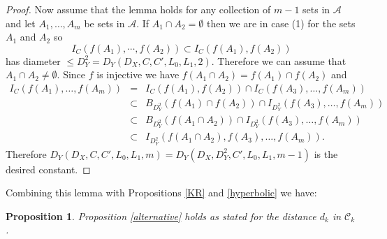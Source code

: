 \documentclass[11pt]{article}
\newtheorem{prop}[thm]{Proposition}
\theoremstyle{remark}
\def\A{{\mathcal A}}
\def\C{{\mathcal C}}
\begin{document}
\begin{proof}
Now assume that the lemma holds for any collection of $m-1$ sets in $\A$ and let $A_1, \dots, A_m$ be sets in $\A$.  If $A_1 \cap A_2 = \emptyset$ then we are in case (1) for the sets $A_1$ and $A_2$ so
$$I_C(f(A_1), \cdots, f(A_2)) \subset I_C(f(A_1), f(A_2))$$
has diameter $\le D^2_Y= D_Y(D_X, C, C', L_0, L_1, 2)$. Therefore we can assume that $A_1 \cap A_2 \neq \emptyset$. Since $f$ is injective we have $f(A_1 \cap A_2) = f(A_1) \cap f(A_2)$ and
\begin{eqnarray*}
I_C(f(A_1), \dots, f(A_m)) &=& I_C(f(A_1), f(A_2)) \cap I_C(f(A_3), \dots, f(A_m)) \\
& \subset & B_{D^2_Y}(f(A_1) \cap f(A_2)) \cap I_{D^2_Y}(f(A_3), \dots, f(A_m)) \\
& \subset & B_{D^2_Y}(f(A_1 \cap A_2)) \cap I_{D^2_Y}(f(A_3), \dots, f(A_m)) \\
& \subset & I_{D^2_Y}(f(A_1 \cap A_2),f(A_3), \dots, f(A_m)).
\end{eqnarray*}
Therefore $D_Y(D_X, C,C', L_0, L_1, m) = D_Y(D_X, D^2_Y,C', L_0, L_1, m-1)$ is the desired constant.
\end{proof}

Combining this lemma with Propositions \ref{KR} and \ref{hyperbolic} we have:

\begin{prop}\label{k alternative}
  Proposition \ref{alternative} holds as stated for the distance $d_k$
  in $\C_k$.
\end{prop}



\end{document}
